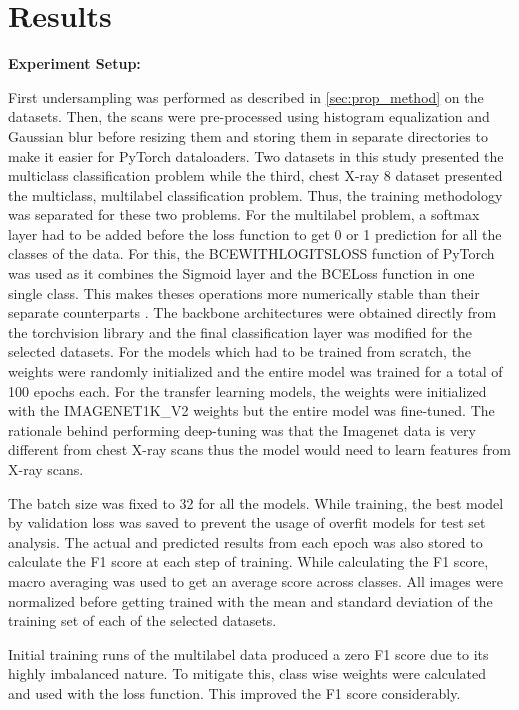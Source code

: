 \documentclass[10pt,twocolumn,letterpaper]{article}
\begin{document}
\section{Results} 
\label{sec:result}
\textbf{Experiment Setup:}

First undersampling was performed as described in \cref{sec:prop_method} on the datasets. Then,
the scans were pre-processed using histogram equalization and Gaussian blur before resizing them 
and storing them in separate directories to make it easier for PyTorch dataloaders. 
Two datasets in this study presented the multiclass classification problem while the third, 
chest X-ray 8 dataset presented the multiclass, multilabel classification problem. Thus, the 
training methodology was separated for these two problems. For the multilabel problem, 
a softmax layer had to be added before the loss function to get 0 or 1 prediction for 
all the classes of the data. For this, the BCEWITHLOGITSLOSS function of PyTorch was used 
as it combines the Sigmoid layer and the BCELoss function in one single class. This makes 
theses operations more numerically stable than their separate counterparts \cite{bcelogits}.
The backbone architectures were obtained directly from the torchvision library and the final 
classification layer was modified for the selected datasets. For the models which had to be 
trained from scratch, the weights were randomly initialized and the entire model was trained 
for a total of 100 epochs each. For the transfer learning models, the weights were initialized 
with the IMAGENET1K\_V2 weights but the entire model was fine-tuned. The rationale behind 
performing deep-tuning was that the Imagenet data is very different from chest X-ray scans 
thus the model would need to learn features from X-ray scans. 

The batch size was fixed to 32 for all the models. 
While training, the best model by validation loss was saved to prevent the usage of overfit 
models for test set analysis. The actual and predicted results from each epoch was also stored 
to calculate the F1 score at each step of training. While calculating the F1 score, macro averaging 
was used to get an average score across classes. All images were normalized before getting trained 
with the mean and standard deviation of the training set of each of the selected datasets.

Initial training runs of the multilabel data produced a zero F1 score due to its highly imbalanced 
nature. To mitigate this, class wise weights were calculated and used with the loss function. 
This improved the F1 score considerably. 
\end{document}
